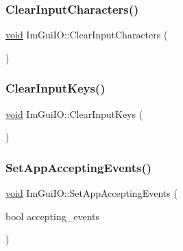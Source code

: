 \mbox{\label{structImGuiIO_a82d8794e14e628efbb026af4202c70ca}} 
\subsubsection{\texorpdfstring{Clear\+Input\+Characters()}{ClearInputCharacters()}}
{\footnotesize\ttfamily \hyperlink{imgui__impl__opengl3__loader_8h_ac668e7cffd9e2e9cfee428b9b2f34fa7}{void} Im\+Gui\+I\+O\+::\+Clear\+Input\+Characters (\begin{DoxyParamCaption}{ }\end{DoxyParamCaption})}

\mbox{\label{structImGuiIO_a5d87fb4f10e366ef8a4603ac57e39da1}} 
\subsubsection{\texorpdfstring{Clear\+Input\+Keys()}{ClearInputKeys()}}
{\footnotesize\ttfamily \hyperlink{imgui__impl__opengl3__loader_8h_ac668e7cffd9e2e9cfee428b9b2f34fa7}{void} Im\+Gui\+I\+O\+::\+Clear\+Input\+Keys (\begin{DoxyParamCaption}{ }\end{DoxyParamCaption})}

\mbox{\label{structImGuiIO_a8ec563cbffee4818a89840654b8c4404}} 
\subsubsection{\texorpdfstring{Set\+App\+Accepting\+Events()}{SetAppAcceptingEvents()}}
{\footnotesize\ttfamily \hyperlink{imgui__impl__opengl3__loader_8h_ac668e7cffd9e2e9cfee428b9b2f34fa7}{void} Im\+Gui\+I\+O\+::\+Set\+App\+Accepting\+Events (\begin{DoxyParamCaption}\item[{bool}]{accepting\+\_\+events }\end{DoxyParamCaption})}

